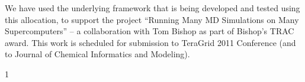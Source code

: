 \documentclass[a4paper,12pt]{article}
\begin{document}
We have used the underlying framework that is being developed and
tested using this allocation, to support the project ``Running Many MD
Simulations on Many Supercomputers'' -- a collaboration with Tom
Bishop as part of Bishop's TRAC award. This work is scheduled for
submission to TeraGrid 2011 Conference (and to Journal of Chemical
Informatics and Modeling).

1
\end{document}
